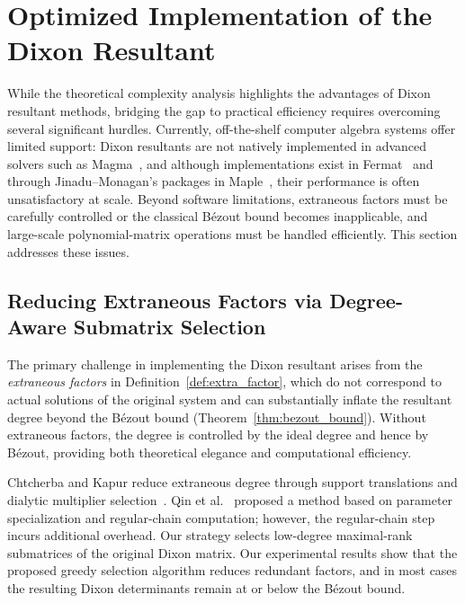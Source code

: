 \section{Optimized Implementation of the Dixon Resultant}\label{Section:Improvements}

While the theoretical complexity analysis highlights the advantages of Dixon resultant methods, bridging the gap to practical efficiency requires overcoming several significant hurdles. Currently, off-the-shelf computer algebra systems offer limited support: Dixon resultants are not natively implemented in advanced solvers such as Magma~\cite{magma}, and although implementations exist in Fermat~\cite{fermat} and through Jinadu--Monagan's packages in Maple~\cite{DBLP:conf/casc/JinaduM22,JinaduMonagan2025}, their performance is often unsatisfactory at scale. Beyond software limitations, extraneous factors must be carefully controlled or the classical B\'ezout bound becomes inapplicable, and large-scale polynomial-matrix operations must be handled efficiently. This section addresses these issues.

\subsection{Reducing Extraneous Factors via Degree-Aware Submatrix Selection}
\label{Subsection:Extraneous}

The primary challenge in implementing the Dixon resultant arises from the \emph{extraneous factors} in Definition~\ref{def:extra_factor}, which do not correspond to actual solutions of the original system and can substantially inflate the resultant degree beyond the B\'ezout bound (Theorem~\ref{thm:bezout_bound}). Without extraneous factors, the degree is controlled by the ideal degree and hence by B\'ezout, providing both theoretical elegance and computational efficiency.

Chtcherba and Kapur reduce extraneous degree through support translations and dialytic multiplier selection~\cite[Section~9]{ChtcherbaKapur2004Bivariate}. Qin et al.~\cite{DBLP:journals/jsc/QinZYC22} proposed a method based on parameter specialization and regular-chain computation; however, the regular-chain step incurs additional overhead. Our strategy selects low-degree maximal-rank submatrices of the original Dixon matrix. Our experimental results show that the proposed greedy selection algorithm reduces redundant factors, and in most cases the resulting Dixon determinants remain at or below the B\'ezout bound.

